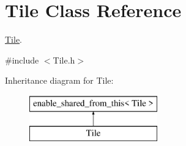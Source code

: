 \hypertarget{class_tile}{\section{Tile Class Reference}
\label{class_tile}
}


\hyperlink{class_tile}{Tile}.  




{\ttfamily \#include $<$Tile.\+h$>$}

Inheritance diagram for Tile\+:\begin{figure}[H]
\begin{center}
\leavevmode
\includegraphics[height=2.000000cm]{class_tile}
\end{center}
\end{figure}
